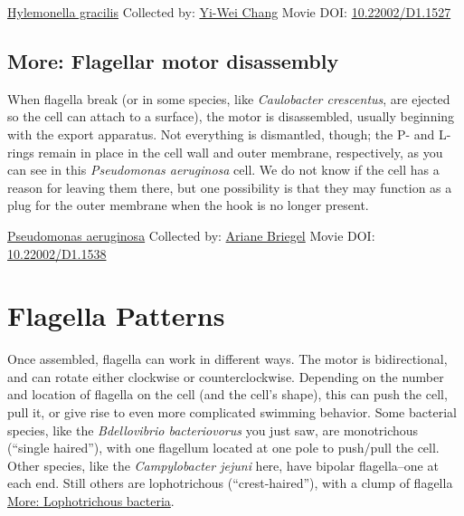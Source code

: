 \documentclass[]{tufte-book}
\begin{document}
\hypertarget{htmlwidget-68fefe2fc4fd67de7224}{}

\label{fig:6-3}\protect\hyperlink{tree}{Hylemonella gracilis} Collected by: \protect\hyperlink{yi-wei_chang}{Yi-Wei Chang} Movie DOI: \href{https://doi.org/10.22002/D1.1527}{10.22002/D1.1527}

\hypertarget{Flagellar_motor_disassembly}{%
\subsection*{More: Flagellar motor disassembly}\label{Flagellar_motor_disassembly}}

When flagella break (or in some species, like \emph{Caulobacter crescentus}, are ejected so the cell can attach to a surface), the motor is disassembled, usually beginning with the export apparatus. Not everything is dismantled, though; the P- and L-rings remain in place in the cell wall and outer membrane, respectively, as you can see in this \emph{Pseudomonas aeruginosa} cell. We do not know if the cell has a reason for leaving them there, but one possibility is that they may function as a plug for the outer membrane when the hook is no longer present.



\hypertarget{htmlwidget-aecac07dc80b7eadbab2}{}

\label{fig:6-3a}\protect\hyperlink{tree}{Pseudomonas aeruginosa} Collected by: \protect\hyperlink{ariane_briegel}{Ariane Briegel} Movie DOI: \href{https://doi.org/10.22002/D1.1538}{10.22002/D1.1538}

\hypertarget{flagella-patterns}{%
\section{Flagella Patterns}\label{flagella-patterns}}

Once assembled, flagella can work in different ways. The motor is bidirectional, and can rotate either clockwise or counterclockwise. Depending on the number and location of flagella on the cell (and the cell's shape), this can push the cell, pull it, or give rise to even more complicated swimming behavior. Some bacterial species, like the \emph{Bdellovibrio bacteriovorus} you just saw, are monotrichous (``single haired''), with one flagellum located at one pole to push/pull the cell. Other species, like the \emph{Campylobacter jejuni} here, have bipolar flagella--one at each end. Still others are lophotrichous (``crest-haired''), with a clump of flagella \protect\hyperlink{Lophotrichous_bacteria}{More: Lophotrichous bacteria}.
\end{document}
